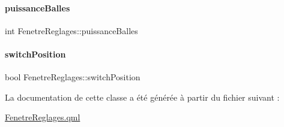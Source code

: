 \mbox{\label{class_fenetre_reglages_a442ad111a0b8a892218fd3028dd83716}} 
\paragraph{\texorpdfstring{puissance\+Balles}{puissanceBalles}}
{\footnotesize\ttfamily int Fenetre\+Reglages\+::puissance\+Balles}

\mbox{\label{class_fenetre_reglages_aea71275ec9f3fece52a0db20990a8642}} 
\paragraph{\texorpdfstring{switch\+Position}{switchPosition}}
{\footnotesize\ttfamily bool Fenetre\+Reglages\+::switch\+Position}



La documentation de cette classe a été générée à partir du fichier suivant \+:\begin{DoxyCompactItemize}
\item 
\hyperlink{_fenetre_reglages_8qml}{Fenetre\+Reglages.\+qml}\end{DoxyCompactItemize}
